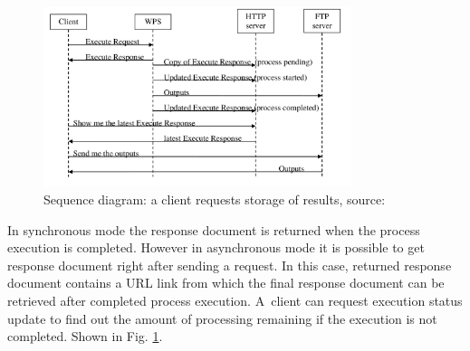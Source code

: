 \begin{figure}[h!]
\centering
\includegraphics[width=0.8\textwidth]{img/WPS_sequence.png}
\caption{Sequence diagram: a client requests storage of results, source: \cite{WPS_standart_1.0}}
\label{fig:WPS_sequence}
\end{figure}

In synchronous mode the response document is returned when the process execution is completed. However in asynchronous
mode it is possible to get
response document right after sending a request. In this case, returned response document contains a URL link from which 
the final response document can be retrieved after completed process execution. A~client can request execution status 
update to find out the amount of processing remaining if the execution is not completed. Shown in Fig. 
\ref{fig:WPS_sequence}.



